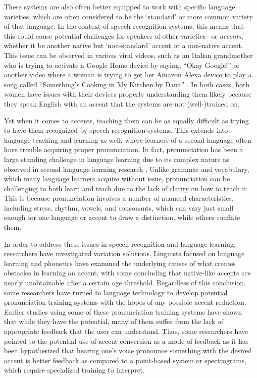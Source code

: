 \documentclass
[
    a4paper,
    twoside,
    12pt,
]
{report}
\begin{document}
These systems are also often better equipped to work with specific
language varieties, which are often considered to be the `standard' or
more common variety of that language. In the context of speech
recognition systems, this means that this could cause potential
challenges for speakers of other varieties-- or \emph{accents}, whether
it be another native but `non-standard' accent or a non-native accent.
This issue can be observed in various viral videos, such as an Italian
grandmother who is trying to activate a Google Home device by saying,
``Okay Google!'' \parencite{actis2017} or another video where a woman is
trying to get her Amazon Alexa device to play a song called
``Something's Cooking in My Kitchen by Dana'' \parencite{newsflare2018}.
In both cases, both women have issues with their devices properly
understanding them likely because they speak English with an accent that
the systems are not (well-)trained on.

Yet when it comes to accents, teaching them can be as equally difficult
as trying to have them recognized by speech recognition systems. This
extends into language teaching and learning as well, where learners of a
second language often have trouble acquiring proper pronunciation. In
fact, pronunciation has been a large standing challenge in language
learning due to its complex nature as observed in second language
learning research \parencite{lenneberg1967a, scovel1988a, flege1995}.
Unlike grammar and vocabulary, which many language learners acquire
without issue, pronunciation can be challenging to both learn and teach
due to the lack of clarity on how to teach it \parencite{darcy2012}.
This is because pronunciation involves a number of nuanced
characteristics, including stress, rhythm, vowels, and consonants, which
can vary just small enough for one language or accent to draw a
distinction, while others conflate them.

In order to address these issues in speech recognition and language
learning, researchers have investigated variation solutions. Linguists
focused on language learning and phonetics have examined the underlying
causes of what creates obstacles in learning an accent, with some
concluding that native-like accents are nearly unobtainable after a
certain age threshold. Regardless of this conclusion, some researchers
have turned to language technology to develop potential pronunciation
training systems with the hopes of any possible accent reduction.
Earlier studies using some of these pronunciation training systems have
shown that while they have the potential, many of them suffer from the
lack of appropriate feedback that the user can understand. Thus, some
researchers have pointed to the potential use of accent conversion as a
mode of feedback as it has been hypothesized that hearing one's voice
pronounce something with the desired accent is better feedback as
compared to a point-based system or spectrograms, which require
specialized training to interpret.
\end{document}
